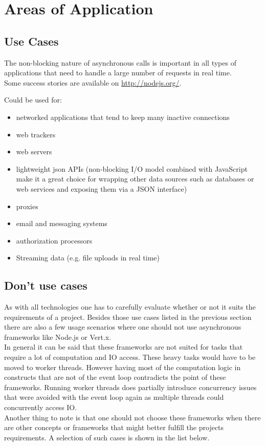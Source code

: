 \FloatBarrier


\newpage
\section{Areas of Application}
\label{areas_of_application}

\subsection{Use Cases}
\label{use_cases}
The non-blocking nature of asynchronous calls is important in all types of
applications that need to handle a large number of requests in real time.\\
Some success stories are available on \url{http://nodejs.org/}.

Could be used for: 
\begin{itemize}
  \item networked applications that tend to keep many inactive connections
  \item web trackers
  \item web servers
  \item lightweight json APIs (non-blocking I/O model 
  		combined with JavaScript make it a great choice for
  		wrapping other data sources such as databases or web 
  		services and exposing them via a JSON interface)%
  \item proxies
  \item email and messaging systems
  \item authorization processors
  \item Streaming data (e.g. file uploads in real time)
\end{itemize}

\subsection{Don't use cases}
\label{dont_use_cases}


As with all technologies one has to carefully evaluate whether or not it suits the
requirements of a project. Besides those use cases listed in the previous
section there are also a few usage scenarios where one should not use
asynchronous frameworks like Node.js or Vert.x.\\
In general it can be said that these frameworks are not suited for tasks that
require a lot of computation and IO access. These heavy tasks would have to be
moved to worker threads. However having most of the computation logic in
constructs that are not of the event loop contradicts the point of these
frameworks. Running worker threads does partially introduce concurrency issues that were
avoided with the event loop again as multiple threads could concurrently access IO.\\
Another thing to note is that one should not choose these frameworks when
there are other concepts or frameworks that might better fulfill the 
projects requirements.
A selection of such cases is shown in the list below. 

